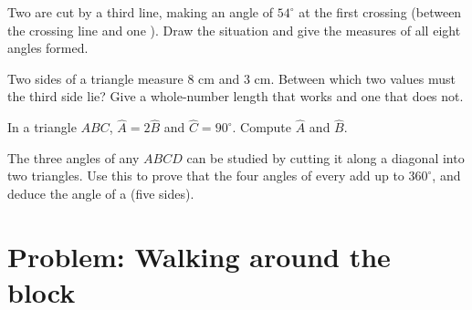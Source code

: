 \begin{exercise}[$\star\star$]\label{exo:g7:triangles:8}
Two  are cut by a third line, making an angle of
$54^\circ$ at the first crossing (between the crossing line and one
). Draw the situation and give the measures of all eight
angles formed.
\end{exercise}

\begin{exercise}[$\star\star$]\label{exo:g7:triangles:9}
Two sides of a triangle measure $8$ cm and $3$ cm. Between which two
values must the third side lie? Give a whole-number length that works
and one that does not.
\end{exercise}

\begin{exercise}[$\star\star$]\label{exo:g7:triangles:10}
In a triangle $ABC$, $\widehat A = 2\widehat B$ and
$\widehat C = 90^\circ$. Compute $\widehat A$ and $\widehat B$.
\end{exercise}

\begin{exercise}[$\star\star\star$]\label{exo:g7:triangles:11}
The three angles of any  $ABCD$ can be studied by
cutting it along a diagonal into two triangles. Use this to prove that
the four angles of every  add up to $360^\circ$, and
deduce the angle  of a  (five sides).
\end{exercise}

\section{Problem: Walking around the block}

